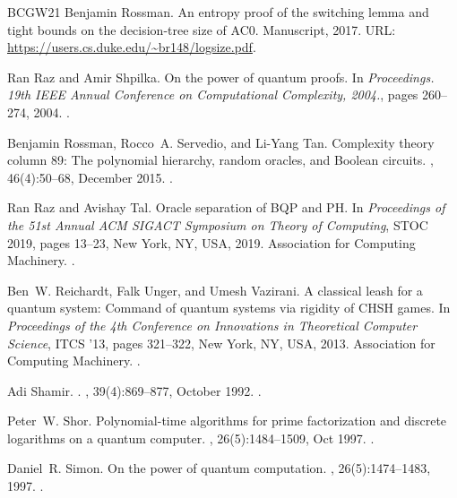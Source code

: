 \documentclass[10pt,a4paper]{article}
\begin{document}
\begin{thebibliography}{BCGW21}
Benjamin Rossman.
\newblock An entropy proof of the switching lemma and tight bounds on the
  decision-tree size of {AC0}.
\newblock Manuscript, 2017.
\newblock URL: \url{https://users.cs.duke.edu/~br148/logsize.pdf}.

Ran Raz and Amir Shpilka.
\newblock On the power of quantum proofs.
\newblock In {\em Proceedings. 19th IEEE Annual Conference on Computational
  Complexity, 2004.}, pages 260--274, 2004.
\newblock \href {https://doi.org/10.1109/CCC.2004.1313849}
  {}.

Benjamin Rossman, Rocco~A. Servedio, and Li-Yang Tan.
\newblock Complexity theory column 89: The polynomial hierarchy, random
  oracles, and {B}oolean circuits.
, 46(4):50--68, December 2015.
\newblock \href {https://doi.org/10.1145/2852040.2852052}
  {}.

Ran Raz and Avishay Tal.
\newblock Oracle separation of {BQP} and {PH}.
\newblock In {\em Proceedings of the 51st Annual ACM SIGACT Symposium on Theory
  of Computing}, STOC 2019, pages 13--23, New York, NY, USA, 2019. Association
  for Computing Machinery.
\newblock \href {https://doi.org/10.1145/3313276.3316315}
  {}.

Ben~W. Reichardt, Falk Unger, and Umesh Vazirani.
\newblock A classical leash for a quantum system: Command of quantum systems
  via rigidity of {CHSH} games.
\newblock In {\em Proceedings of the 4th Conference on Innovations in
  Theoretical Computer Science}, ITCS '13, pages 321--322, New York, NY, USA,
  2013. Association for Computing Machinery.
\newblock \href {https://doi.org/10.1145/2422436.2422473}
  {}.

Adi Shamir.
.
, 39(4):869--877, October 1992.
\newblock \href {https://doi.org/10.1145/146585.146609}
  {}.

Peter~W. Shor.
\newblock Polynomial-time algorithms for prime factorization and discrete
  logarithms on a quantum computer.
, 26(5):1484--1509, Oct 1997.
\newblock \href {https://doi.org/10.1137/S0097539795293172}
  {}.

Daniel~R. Simon.
\newblock On the power of quantum computation.
, 26(5):1474--1483, 1997.
\newblock \href {https://doi.org/10.1137/S0097539796298637}
  {}.


\end{thebibliography}
\end{document}
